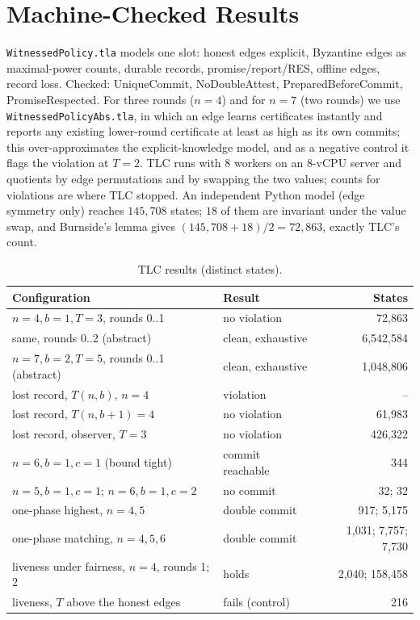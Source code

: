 \documentclass[conference]{IEEEtran}
\begin{document}
\section{Machine-Checked Results}\label{sec:tlc}
\texttt{WitnessedPolicy.tla} models one slot: honest edges explicit, Byzantine edges as maximal-power counts, durable records, promise/report/RES, offline edges, record loss. Checked: UniqueCommit, NoDoubleAttest, PreparedBeforeCommit, PromiseRespected. For three rounds ($n{=}4$) and for $n{=}7$ (two rounds) we use \texttt{WitnessedPolicyAbs.tla}, in which an edge learns certificates instantly and reports any existing lower-round certificate at least as high as its own commits; this over-approximates the explicit-knowledge model, and as a negative control it flags the violation at $T{=}2$. TLC runs with 8 workers on an 8-vCPU server and quotients by edge permutations and by swapping the two values; counts for violations are where TLC stopped. An independent Python model (edge symmetry only) reaches $145{,}708$ states; $18$ of them are invariant under the value swap, and Burnside's lemma gives $(145{,}708{+}18)/2=72{,}863$, exactly TLC's count.
\begin{table}[t]
\centering\caption{TLC results (distinct states).}\label{tab:tlc}
\scriptsize
\begin{tabular}{@{}p{3.7cm}p{2.0cm}r@{}}
\toprule
Configuration & Result & States\\
\midrule
$n{=}4,b{=}1,T{=}3$, rounds 0..1 & no violation & 72,863\\
same, rounds 0..2 (abstract) & clean, exhaustive & 6,542,584\\
$n{=}7,b{=}2,T{=}5$, rounds 0..1 (abstract) & clean, exhaustive & 1,048,806\\
lost record, $T(n,b)$, $n{=}4$ & violation & --\\
lost record, $T(n,b{+}1)=4$ & no violation & 61,983\\
lost record, observer, $T{=}3$ & no violation & 426,322\\
$n{=}6,b{=}1,c{=}1$ (bound tight) & commit reachable & 344\\
$n{=}5,b{=}1,c{=}1$; $n{=}6,b{=}1,c{=}2$ & no commit & 32; 32\\
one-phase highest, $n{=}4,5$ & double commit & 917; 5,175\\
one-phase matching, $n{=}4,5,6$ & double commit & 1,031; 7,757; 7,730\\
liveness under fairness, $n{=}4$, rounds 1; 2 & holds & 2,040; 158,458\\
liveness, $T$ above the honest edges & fails (control) & 216\\
\bottomrule
\end{tabular}
\end{table}
\end{document}
